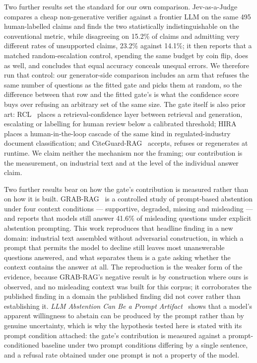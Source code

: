 \documentclass[preprint,3p,times]{elsarticle}
\begin{document}
Two further results set the standard for our own comparison. Jev-as-a-Judge~\cite{rosario2026jev}
compares a cheap non-generative verifier against a frontier LLM on the same 495
human-labelled claims and finds the two statistically indistinguishable on the
conventional metric, while disagreeing on 15.2\% of claims and admitting very
different rates of unsupported claims, 23.2\% against 14.1\%; it then reports that a
matched random-escalation control, spending the same budget by coin flip, does as
well, and concludes that equal accuracy conceals unequal errors. We therefore run
that control: our generator-side comparison includes an arm that refuses the same
number of questions as the fitted gate and picks them at random, so the difference
between that row and the fitted gate's is what the confidence score buys over
refusing an arbitrary set of the same size. The gate itself is also prior art:
RCL~\cite{ravuri2026rcl} places a retrieval-confidence layer between retrieval and
generation, escalating or labelling for human review below a calibrated threshold;
HIRA~\cite{tian2026hira} places a human-in-the-loop cascade of the same kind in
regulated-industry document classification; and CiteGuard-RAG~\cite{zheng2026citeguard}
accepts, refuses or regenerates at
runtime. We claim neither the mechanism nor the framing; our contribution is the
measurement, on industrial text and at the level of the individual answer claim.

Two further results bear on how the gate's contribution is measured rather than
on how it is built. GRAB-RAG~\cite{setiawan2026grabrag} is a controlled study of
prompt-based abstention under four context conditions --- supportive,
degraded, missing and misleading --- and reports that models still answer
41.6\% of misleading questions under explicit abstention prompting. This work
reproduces that headline finding in a new domain: industrial text assembled
without adversarial construction, in which a prompt that permits the model to
decline still leaves most unanswerable questions answered, and what separates
them is a gate asking whether the context contains the answer at all. The
reproduction is the weaker form of the evidence, because GRAB-RAG's negative
result is by construction where ours is observed, and no misleading context
was built for this corpus; it corroborates the published finding in a domain
the published finding did not cover rather than establishing it.
\emph{LLM Abstention Can Be a Prompt Artifact}~\cite{ling2026promptartifact}
shows that a model's apparent willingness to abstain can be produced by the
prompt rather than by genuine uncertainty, which is why the hypothesis tested
here is stated with its prompt condition attached: the gate's contribution is
measured against a prompt-conditioned baseline under two prompt conditions
differing by a single sentence, and a refusal rate obtained under one prompt
is not a property of the model.
\end{document}
